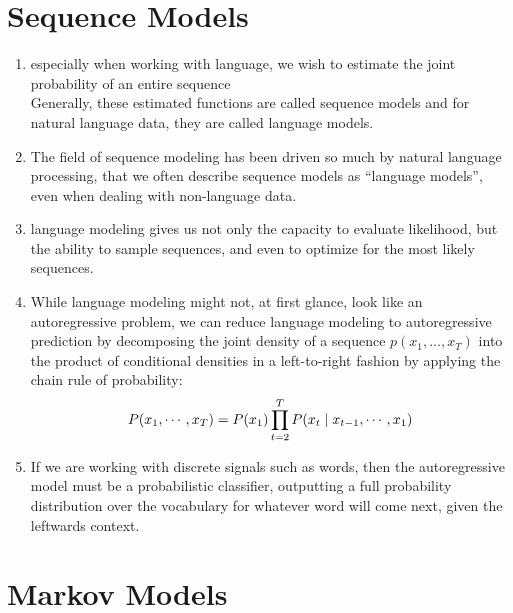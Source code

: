 \section{Sequence Models \cite{dnn-1}} \label{Sequence Models}

\begin{enumerate}
    \item especially when working with language, we wish to estimate the joint probability of an entire sequence\\
    Generally, these estimated functions are called sequence models and for natural language data, they are called language models.

    \item The field of sequence modeling has been driven so much by natural language processing, that we often describe sequence models as “language models”, even when dealing with non-language data.

    \item language modeling gives us not only the capacity to evaluate likelihood, but the ability to sample sequences, and even to optimize for the most likely sequences.

    \item While language modeling might not, at first glance, look like an autoregressive problem, we can reduce language modeling to autoregressive prediction by decomposing the joint density of a sequence $p(x_1, \ldots, x_T)$ into the product of conditional densities in a left-to-right fashion by applying the chain rule of probability:
    \[
        \hfill
        P(x_1, \cdots, x_T) = P(x_1) \dprod_{t=2}^T P(x_t \mid x_{t-1}, \cdots, x_1)
        \hfill
    \]

    \item If we are working with discrete signals such as words, then the autoregressive model must be a probabilistic classifier, outputting a full probability distribution over the vocabulary for whatever word will come next, given the leftwards context.

\end{enumerate}


\section{Markov Models \cite{dnn-1}}\label{rnn: Markov Models}


